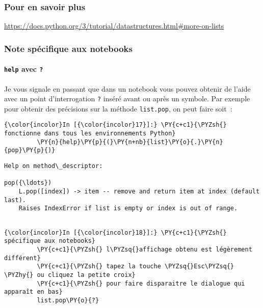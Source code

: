     \hypertarget{pour-en-savoir-plus}{%
\subsubsection{Pour en savoir plus}\label{pour-en-savoir-plus}}

    \href{https://docs.python.org/3/tutorial/datastructures.html\#more-on-lists}{https://docs.python.org/3/tutorial/datastructures.html\#more-on-lists}

    \hypertarget{note-spuxe9cifique-aux-notebooks}{%
\subsubsection{Note spécifique aux
notebooks}\label{note-spuxe9cifique-aux-notebooks}}

    \hypertarget{help-avec}{%
\paragraph{\texorpdfstring{\texttt{help} avec
\texttt{?}}{help avec ?}}\label{help-avec}}

    Je vous signale en passant que dans un notebook vous pouvez obtenir de
l'aide avec un point d'interrogation \texttt{?} inséré avant ou après un
symbole. Par exemple pour obtenir des précisions sur la méthode
\texttt{list.pop}, on peut faire soit~:

    \begin{Verbatim}[commandchars=\\\{\}]
{\color{incolor}In [{\color{incolor}17}]:} \PY{c+c1}{\PYZsh{} fonctionne dans tous les environnements Python}
         \PY{n}{help}\PY{p}{(}\PY{n+nb}{list}\PY{o}{.}\PY{n}{pop}\PY{p}{)}
\end{Verbatim}


    \begin{Verbatim}[commandchars=\\\{\}]
Help on method\_descriptor:

pop({\ldots})
    L.pop([index]) -> item -- remove and return item at index (default last).
    Raises IndexError if list is empty or index is out of range.


    \end{Verbatim}

    \begin{Verbatim}[commandchars=\\\{\}]
{\color{incolor}In [{\color{incolor}18}]:} \PY{c+c1}{\PYZsh{} spécifique aux notebooks}
         \PY{c+c1}{\PYZsh{} l\PYZsq{}affichage obtenu est légèrement différent}
         \PY{c+c1}{\PYZsh{} tapez la touche \PYZsq{}Esc\PYZsq{} \PYZhy{} ou cliquez la petite croix}
         \PY{c+c1}{\PYZsh{} pour faire disparaitre le dialogue qui apparaît en bas}
         list.pop\PY{o}{?}
\end{Verbatim}



